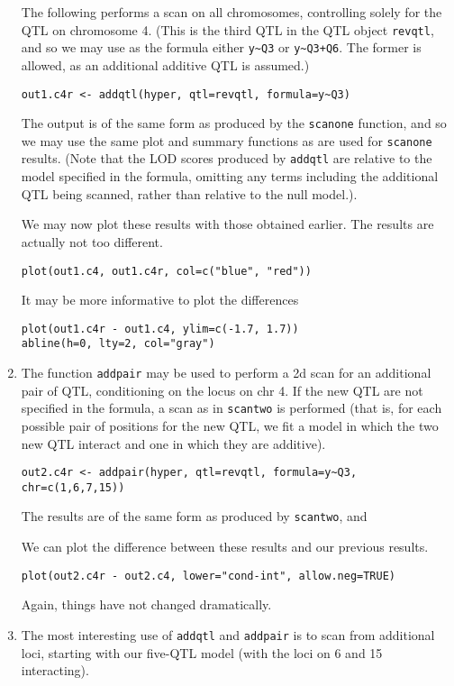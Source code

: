 \documentclass[10pt,letterpaper]{article}
\newcommand{\usercolor}{\color [named]{BlueViolet}}
\begin{document}
\begin{enumerate}
  The following performs a scan on all chromosomes, controlling solely
  for the QTL on chromosome 4.  (This is the third QTL in the QTL
  object \verb-revqtl-, and so we may use as the formula either
  \verb-y~Q3- or \verb-y~Q3+Q6-.  The former is allowed, as an
  additional additive QTL is assumed.)

\usercolor
\verb|out1.c4r <- addqtl(hyper, qtl=revqtl, formula=y~Q3)|
\normalcolor

The output is of the same form as produced by the \verb-scanone-
function, and so we may use the same plot and summary functions as are
used for \verb-scanone- results.  (Note that the LOD scores produced
by \verb-addqtl- are relative to the model specified in the formula,
omitting any terms including the additional QTL being scanned, rather
than relative to the null model.).

We may now plot these results with those obtained earlier.  The
results are actually not too different. 

\usercolor
\verb|plot(out1.c4, out1.c4r, col=c("blue", "red"))| 
\normalcolor

It may be more informative to plot the differences

\usercolor
\verb|plot(out1.c4r - out1.c4, ylim=c(-1.7, 1.7))| \\
\verb|abline(h=0, lty=2, col="gray")|
\normalcolor

\item The function \verb-addpair- may be used to perform a 2d scan for
  an additional pair of QTL, conditioning on the locus on chr 4.  If
  the new QTL are not specified in the formula, a scan as in
  \verb-scantwo- is performed (that is, for each possible pair of
  positions for the new QTL, we fit a model in which the two new QTL
  interact and one in which they are additive).

\usercolor
\verb|out2.c4r <- addpair(hyper, qtl=revqtl, formula=y~Q3, chr=c(1,6,7,15))|
\normalcolor

The results are of the same form as produced by \verb-scantwo-, and

We can plot the difference between these results and our previous
results.

\usercolor
\verb|plot(out2.c4r - out2.c4, lower="cond-int", allow.neg=TRUE)|
\normalcolor

Again, things have not changed dramatically.

\item The most interesting use of \verb-addqtl- and \verb-addpair- is
  to scan from additional loci, starting with our five-QTL model (with
  the loci on 6 and 15 interacting).


\end{enumerate}
\end{document}
